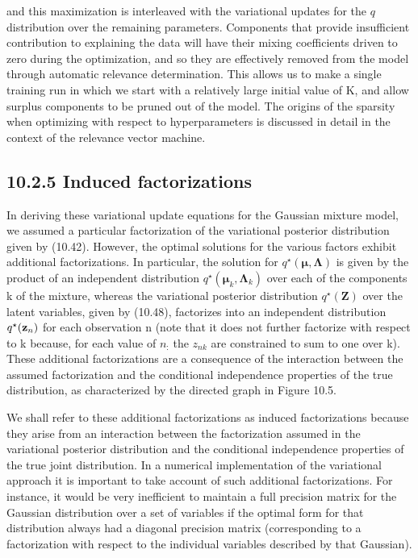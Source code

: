 \documentclass[
  10
]{article}
\begin{document}
and this maximization is interleaved with the variational updates for
the \(q\) distribution over the remaining parameters. Components that
provide insufficient contribution to explaining the data will have their
mixing coefficients driven to zero during the optimization, and so they
are effectively removed from the model through automatic relevance
determination. This allows us to make a single training run in which we
start with a relatively large initial value of K, and allow surplus
components to be pruned out of the model. The origins of the sparsity
when optimizing with respect to hyperparameters is discussed in detail
in the context of the relevance vector machine.

\subsection{10.2.5 Induced factorizations}\label{induced-factorizations}

In deriving these variational update equations for the Gaussian mixture
model, we assumed a particular factorization of the variational
posterior distribution given by (10.42). However, the optimal solutions
for the various factors exhibit additional factorizations. In
particular, the solution for
\(q ^ { \star } ( \pmb { \mu } , \pmb { \Lambda } )\) is given by the
product of an independent distribution
\(q ^ { \star } ( \pmb { \mu } _ { k } , \pmb { \Lambda } _ { k } )\)
over each of the components k of the mixture, whereas the variational
posterior distribution \(q ^ { \star } ( \mathbf { Z } )\) over the
latent variables, given by (10.48), factorizes into an independent
distribution \({ { q } ^ { \star } } ( { \bf { z } } _ { n } )\) for
each observation n (note that it does not further factorize with respect
to k because, for each value of \(n _ { \mathrm { : } }\) the
\(z _ { n k }\) are constrained to sum to one over k). These additional
factorizations are a consequence of the interaction between the assumed
factorization and the conditional independence properties of the true
distribution, as characterized by the directed graph in Figure 10.5.

We shall refer to these additional factorizations as induced
factorizations because they arise from an interaction between the
factorization assumed in the variational posterior distribution and the
conditional independence properties of the true joint distribution. In a
numerical implementation of the variational approach it is important to
take account of such additional factorizations. For instance, it would
be very inefficient to maintain a full precision matrix for the Gaussian
distribution over a set of variables if the optimal form for that
distribution always had a diagonal precision matrix (corresponding to a
factorization with respect to the individual variables described by that
Gaussian).
\end{document}

